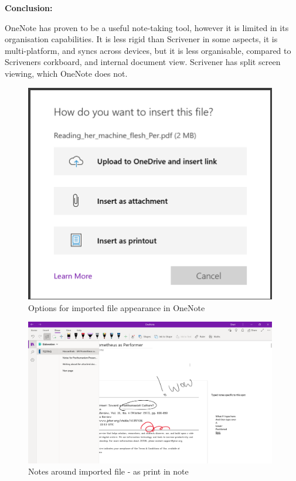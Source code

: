 \documentclass{article}
\begin{document}
\textbf{Conclusion:}

OneNote has proven to be a useful note-taking tool, however it is limited in its organisation capabilities. It is less rigid than Scrivener in some aspects, it is multi-platform, and syncs across devices, but it is less organisable, compared to Scriveners corkboard, and internal document view. Scrivener has split screen viewing, which OneNote does not.

\begin{figure}[htbp]
    \centering
    \includegraphics[width=11cm]{Images/OneNoteTest004.PNG}
    \caption{Options for imported file appearance in OneNote}
    \label{fig:OneNote File Import}
\end{figure}

\begin{figure}[htbp]
    \centering
    \includegraphics[width=11cm]{Images/OneNoteTest006.PNG}
    \caption{Notes around imported file - as print in note}
    \label{fig:OneNote Note Flexibility}
\end{figure}
\end{document}
